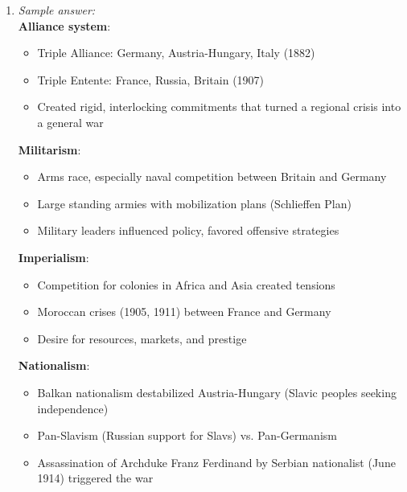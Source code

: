\documentclass[11pt]{article}
\begin{document}
\begin{enumerate}[label=\textbf{\arabic*.}]
  \textbf{Significance}: Maintained relative peace in Europe (1815--1854), preventing general war. 
  Congresses at Aix-la-Chapelle, Troppau, and Verona addressed crises.

  \textbf{Limitations}:
  \begin{itemize}
    \item Could not permanently suppress nationalism and liberalism
    \item Britain withdrew from interventionist policies (Crimean War broke the system)
    \item Ignored aspirations of people for self-determination
    \item Eventually undermined by nationalist movements (Italian and German unification, Greek independence)
  \end{itemize}

  \item \emph{Sample answer:}\\
  \textbf{Alliance system}:
  \begin{itemize}
    \item Triple Alliance: Germany, Austria-Hungary, Italy (1882)
    \item Triple Entente: France, Russia, Britain (1907)
    \item Created rigid, interlocking commitments that turned a regional crisis into a general war
  \end{itemize}

  \textbf{Militarism}:
  \begin{itemize}
    \item Arms race, especially naval competition between Britain and Germany
    \item Large standing armies with mobilization plans (Schlieffen Plan)
    \item Military leaders influenced policy, favored offensive strategies
  \end{itemize}

  \textbf{Imperialism}:
  \begin{itemize}
    \item Competition for colonies in Africa and Asia created tensions
    \item Moroccan crises (1905, 1911) between France and Germany
    \item Desire for resources, markets, and prestige
  \end{itemize}

  \textbf{Nationalism}:
  \begin{itemize}
    \item Balkan nationalism destabilized Austria-Hungary (Slavic peoples seeking independence)
    \item Pan-Slavism (Russian support for Slavs) vs. Pan-Germanism
    \item Assassination of Archduke Franz Ferdinand by Serbian nationalist (June 1914) triggered the war
  \end{itemize}


\end{enumerate}
\end{document}
